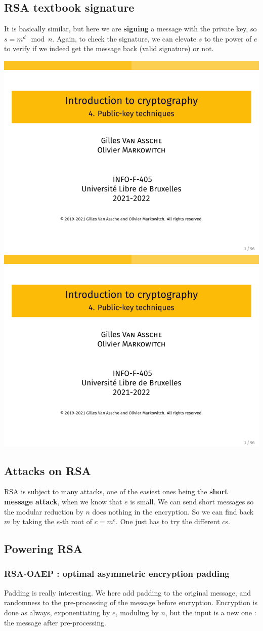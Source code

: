 \documentclass[../Cryptography.tex]{subfiles}
\begin{document}
\subsection{RSA textbook signature}
It is basically similar, but here we are \textbf{signing} a message with the private key, so $s = m^d \mod{n}$. Again, to check the signature, we can elevate $s$ to the power of $e$ to verify if we indeed get the message back (valid signature) or not.

\begin{center}
    \includegraphics[width=0.45\linewidth, page=37]{Slides/4-Public.pdf}
    \includegraphics[width=0.45\linewidth, page=38]{Slides/4-Public.pdf}
\end{center}

\subsection{Attacks on RSA}
RSA is subject to many attacks, one of the easiest ones being the \textbf{short message attack}, when we know that $e$ is small. We can send short messages so the modular reduction by $n$ does nothing in the encryption. So we can find back $m$ by taking the $e$-th root of $c = m^e$. One just has to try the different $c$s.

\subsection{Powering RSA}
\subsubsection{RSA-OAEP : optimal asymmetric encryption padding}
Padding is really interesting. We here add padding to the original message, and randomness to the pre-processing of the message before encryption. Encryption is done as always, exponentiating by $e$, moduling by $n$, but the input is a new one : the message after pre-processing. 
\end{document}
